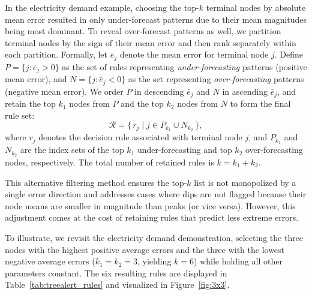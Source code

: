 \documentclass[]{interact}
\theoremstyle{plain}
\theoremstyle{definition}
\theoremstyle{remark}
\begin{document}
In the electricity demand example, choosing the top-$k$ terminal nodes by absolute mean error resulted in only under-forecast patterns due to their mean magnitudes being most dominant. To reveal over-forecast patterns as well, we partition terminal nodes by the sign of their mean error and then rank separately within each partition. Formally, let $\bar{e}_j$ denote the mean error for terminal node $j$. Define $P=\{j:\bar{e}_j>0\}$ as the set of rules representing \textit{under-forecasting} patterns (positive mean error), and $N=\{j:\bar{e}_j<0\}$ as the set representing \textit{over-forecasting} patterns (negative mean error). We order $P$ in descending $\bar{e}_j$ and $N$ in ascending $\bar{e}_j$, and retain the top $k_1$ nodes from $P$ and the top $k_2$ nodes from $N$ to form the final rule set:
\begin{equation}
\mathcal{R} = \{\, r_j \;|\; j \in P_{k_1} \cup N_{k_2} \,\},
\end{equation}
where $r_j$ denotes the decision rule associated with terminal node $j$, and $P_{k_1}$ and $N_{k_2}$ are the index sets of the top $k_1$ under-forecasting and top $k_2$ over-forecasting nodes, respectively. The total number of retained rules is $k = k_1 + k_2$.

This alternative filtering method ensures the top-$k$ list is not monopolized by a single error direction and addresses cases where dips are not flagged because their node means are smaller in magnitude than peaks (or vice versa). However, this adjustment comes at the cost of retaining rules that predict less extreme errors.

To illustrate, we revisit the electricity demand demonstration, selecting the three nodes with the highest positive average errors and the three with the lowest negative average errors ($k_1 = k_2 = 3$, yielding $k = 6$) while holding all other parameters constant. The six resulting rules are displayed in Table~\ref{tab:treealert_rules} and visualized in Figure~\ref{fig:3x3}.
\end{document}

